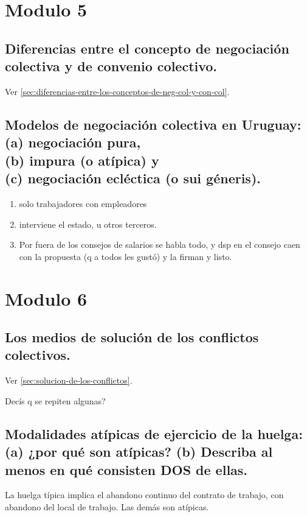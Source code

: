 \documentclass[spanish,12pt,a4paper,titlepage]{report}
\begin{document}
\section{Modulo 5}

\subsection{Diferencias entre el concepto de negociación colectiva y de convenio colectivo.}

Ver \ref{sec:diferencias-entre-los-conceptos-de-neg-col-y-con-col}.

\subsection{Modelos de negociación colectiva en Uruguay:\\(a) negociación pura,\\(b) impura (o atípica) y\\(c) negociación ecléctica (o sui géneris).}

\begin{enumerate}
\item solo trabajadores con empleadores
\item interviene el estado, u otros terceros.
\item Por fuera de los consejos de salarios se habla todo, y dsp en el consejo caen con la propuesta (q a todos les gustó) y la firman y listo.
\end{enumerate}

\section{Modulo 6}

\subsection{Los medios de solución de los conflictos colectivos.}

Ver \ref{sec:solucion-de-los-conflictos}.

Decís q se repiten algunas?

\subsection{Modalidades atípicas de ejercicio de la huelga: (a) ¿por qué son atípicas? (b) Describa al menos en qué consisten DOS de ellas.}

La huelga típica implica el abandono continuo del contrato de trabajo, con abandono del local de trabajo. Las demás son atípicas.
\end{document}
